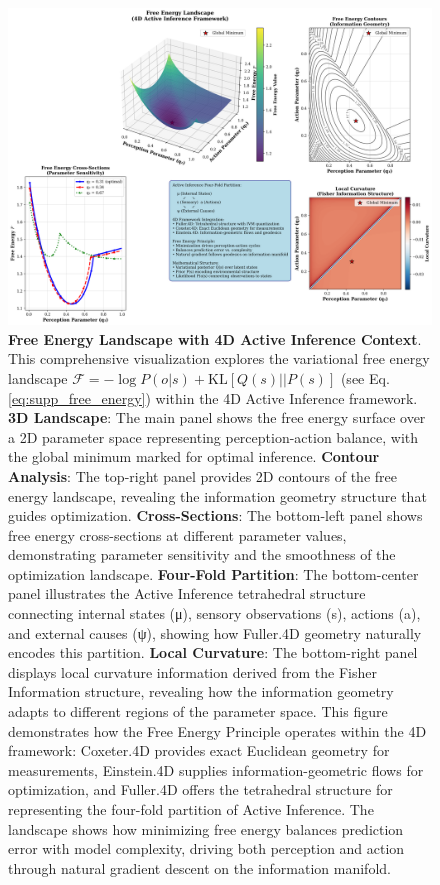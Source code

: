 \documentclass[
  10pt,
]{article}
\begin{document}
\begin{figure}
\centering
\includegraphics{../output/figures/figure_14_free_energy_landscape.png}
\caption{\textbf{Free Energy Landscape with 4D Active Inference
Context}. This comprehensive visualization explores the variational free
energy landscape \(\mathcal{F} = -\log P(o|s) + \text{KL}[Q(s)||P(s)]\)
(see Eq. \eqref{eq:supp_free_energy}) within the 4D Active Inference
framework. \textbf{3D Landscape}: The main panel shows the free energy
surface over a 2D parameter space representing perception-action
balance, with the global minimum marked for optimal inference.
\textbf{Contour Analysis}: The top-right panel provides 2D contours of
the free energy landscape, revealing the information geometry structure
that guides optimization. \textbf{Cross-Sections}: The bottom-left panel
shows free energy cross-sections at different parameter values,
demonstrating parameter sensitivity and the smoothness of the
optimization landscape. \textbf{Four-Fold Partition}: The bottom-center
panel illustrates the Active Inference tetrahedral structure connecting
internal states (μ), sensory observations (s), actions (a), and external
causes (ψ), showing how Fuller.4D geometry naturally encodes this
partition. \textbf{Local Curvature}: The bottom-right panel displays
local curvature information derived from the Fisher Information
structure, revealing how the information geometry adapts to different
regions of the parameter space. This figure demonstrates how the Free
Energy Principle operates within the 4D framework: Coxeter.4D provides
exact Euclidean geometry for measurements, Einstein.4D supplies
information-geometric flows for optimization, and Fuller.4D offers the
tetrahedral structure for representing the four-fold partition of Active
Inference. The landscape shows how minimizing free energy balances
prediction error with model complexity, driving both perception and
action through natural gradient descent on the information manifold.}
\end{figure}
\end{document}
